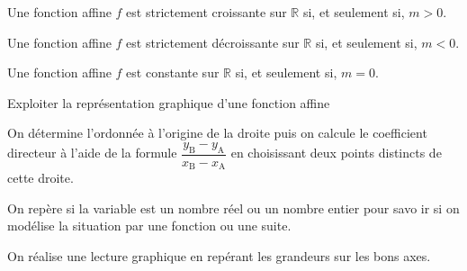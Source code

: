 \begin{bprops}
	\begin{enumProp}
		\item Une fonction affine $f$ est strictement croissante sur $\mathbb{R}$ si, et seulement si, $m>0$.
		\item Une fonction affine $f$ est strictement décroissante sur $\mathbb{R}$ si, et seulement si, $m<0$.
		\item Une fonction affine $f$ est constante sur $\mathbb{R}$ si, et seulement si, $m=0$.
	\end{enumProp}
\end{bprops}

\begin{bmethodet}{Exploiter la représentation graphique d'une fonction affine}
	\begin{itemMet}
		\item On détermine l'ordonnée à l'origine de la droite puis on calcule le coefficient directeur à l'aide de la formule $\dfrac{y_{\mathrm{B}}-y_{\mathrm{A}}}{x_{\mathrm{B}}-x_{\mathrm{A}}}$ en choisissant deux points distincts de cette droite.
		\item On repère si la variable est un nombre réel ou un nombre entier pour savo ir si on modélise la situation par une fonction ou une suite.
		\item On réalise une lecture graphique en repérant les grandeurs sur les bons axes.
	\end{itemMet}
\end{bmethodet}

